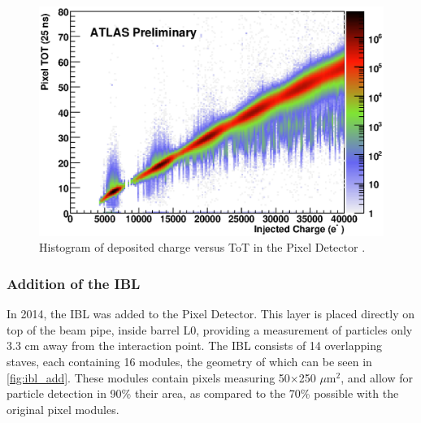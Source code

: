\begin{centering}
\begin{figure}[!htb]
\myfloatalign
\includegraphics[width=.90\linewidth]{figures/atlas/tot_vs_charge_all.eps}
\caption{Histogram of deposited charge versus \ac{ToT} in the Pixel Detector \cite{pixel}.}
\label{fig:pix_tot}
\end{figure}
\end{centering}

\subsubsection{Addition of the IBL}

In 2014, the \ac{IBL} was added to the Pixel Detector. This layer is placed directly on top of the beam pipe, inside barrel L0, providing a measurement of particles only 3.3 cm away from the interaction point. The \ac{IBL} consists of 14 overlapping staves, each containing 16 modules, the geometry of which can be seen in \autoref{fig:ibl_add}. These modules contain pixels measuring 50$\times$250 $\mu$m$^2$, and allow for particle detection in 90\% their area, as compared to the 70\% possible with the original pixel modules.

